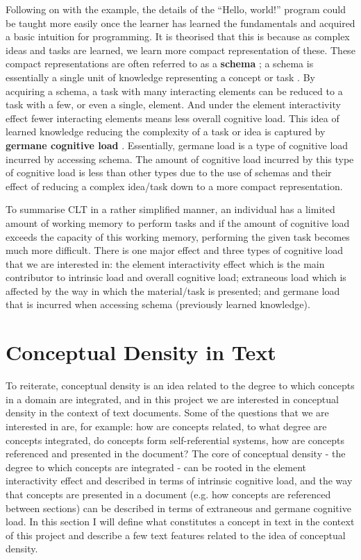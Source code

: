 \documentclass[12pt]{article}
\theoremstyle{grammarstyle}
\newcommand{\keyword}[1]{%
    \textbf{#1}%
}
\begin{document}
Following on with the example, the details of the ``Hello, world!'' program could be taught more easily once the learner has learned the fundamentals and acquired a basic intuition for programming. It is theorised that this is because as complex ideas and tasks are learned, we learn more compact representation of these. These compact representations are often referred to as a \keyword{schema}; a schema is essentially a single unit of knowledge representing a concept or task \citep{axelrod1973schema, abelson1981psychological, bartlett1995remembering}. By acquiring a schema, a task with many interacting elements can be reduced to a task with a few, or even a single, element. And under the element interactivity effect fewer interacting elements means less overall cognitive load. This idea of learned knowledge reducing the complexity of a task or idea is captured by \keyword{germane cognitive load}. Essentially, germane load is a type of cognitive load incurred by accessing schema. The amount of cognitive load incurred by this type of cognitive load is less than other types due to the use of schemas and their effect of reducing a complex idea/task down to a more compact representation.

To summarise CLT in a rather simplified manner, an individual has a limited amount of working memory to perform tasks and if the amount of cognitive load exceeds the capacity of this working memory, performing the given task becomes much more difficult. There is one major effect and three types of cognitive load that we are interested in: the element interactivity effect which is the main contributor to intrinsic load and overall cognitive load; extraneous load which is affected by the way in which the material/task is presented; and germane load that is incurred when accessing schema (previously learned knowledge).

\section{Conceptual Density in Text} \label{sec:conceptual_density_in_text}
To reiterate, conceptual density is an idea related to the degree to which concepts in a domain are integrated, and in this project we are interested in conceptual density in the context of text documents. Some of the questions that we are interested in are, for example: how are concepts related, to what degree are concepts integrated, do concepts form self-referential systems, how are concepts referenced and presented in the document? The core of conceptual density - the degree to which concepts are integrated - can be rooted in the element interactivity effect and described in terms of intrinsic cognitive load, and the way that concepts are presented in a document (e.g. how concepts are referenced between sections) can be described in terms of extraneous and germane cognitive load. In this section I will define what constitutes a concept in text in the context of this project and describe a few text features related to the idea of conceptual density.
\end{document}
